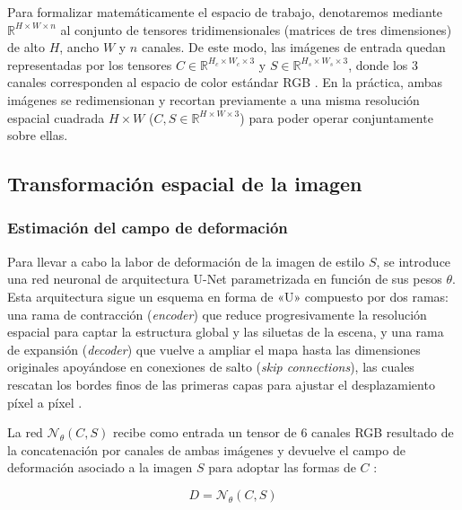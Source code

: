 \documentclass[a4paper]{article}
\begin{document}
\vspace{0.3cm}

\noindent Para formalizar matemáticamente el espacio de trabajo, denotaremos mediante $\mathbb{R}^{H \times W \times n}$ al conjunto de tensores tridimensionales (matrices de tres dimensiones) de alto $H$, ancho $W$ y $n$ canales. De este modo, las imágenes de entrada quedan representadas por los tensores $C \in \mathbb{R}^{H_c \times W_c \times 3}$ y $S \in \mathbb{R}^{H_s \times W_s \times 3}$, donde los $3$ canales corresponden al espacio de color estándar RGB \cite{zamzam2025pixelshuffler}. En la práctica, ambas imágenes se redimensionan y recortan previamente a una misma resolución espacial cuadrada $H \times W$ ($C, S \in \mathbb{R}^{H \times W \times 3}$) para poder operar conjuntamente sobre ellas.

\subsection{Transformación espacial de la imagen}

\subsubsection{Estimación del campo de deformación}

\noindent Para llevar a cabo la labor de deformación de la imagen de estilo $S$, se introduce una red neuronal de arquitectura U-Net \cite{ronneberger2015unet} parametrizada en función de sus pesos $\theta$. Esta arquitectura sigue un esquema en forma de «U» compuesto por dos ramas: una rama de contracción (\textit{encoder}) que reduce progresivamente la resolución espacial para captar la estructura global y las siluetas de la escena, y una rama de expansión (\textit{decoder}) que vuelve a ampliar el mapa hasta las dimensiones originales apoyándose en conexiones de salto (\textit{skip connections}), las cuales rescatan los bordes finos de las primeras capas para ajustar el desplazamiento píxel a píxel \cite{ronneberger2015unet}.

\vspace{0.3cm}

\noindent La red $\mathcal{N}_\theta(C, S)$ recibe como entrada un tensor de 6 canales RGB resultado de la concatenación por canales de ambas imágenes y devuelve el campo de deformación asociado a la imagen $S$ para adoptar las formas de $C$ \cite{zamzam2025pixelshuffler}:

\[
D = \mathcal{N}_\theta(C, S)
\]
\end{document}
